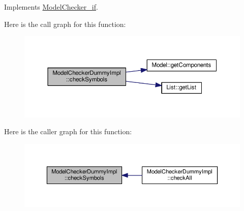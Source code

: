 Implements \hyperlink{class_model_checker__if_a92ab650708e675a1818b41fe4eb93a59}{Model\+Checker\+\_\+if}.



Here is the call graph for this function\+:\nopagebreak
\begin{figure}[H]
\begin{center}
\leavevmode
\includegraphics[width=350pt]{class_model_checker_dummy_impl_a773a4924a7603f6b931a53e58190cda0_cgraph}
\end{center}
\end{figure}




Here is the caller graph for this function\+:\nopagebreak
\begin{figure}[H]
\begin{center}
\leavevmode
\includegraphics[width=350pt]{class_model_checker_dummy_impl_a773a4924a7603f6b931a53e58190cda0_icgraph}
\end{center}
\end{figure}


